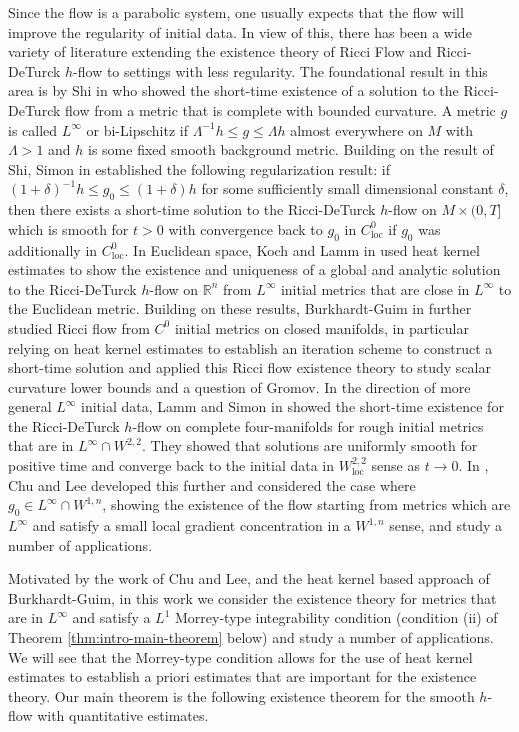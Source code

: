 \documentclass[12pt]{amsart}
\theoremstyle{plain}
\theoremstyle{plain}
\theoremstyle{definition}
\theoremstyle{remark}
\numberwithin{equation}{subsection}
\begin{document}
Since the flow is a parabolic system, one usually expects that the flow will improve the regularity of initial data. In view of this, there has been a wide variety of literature extending the existence theory of Ricci Flow and Ricci-DeTurck $h$-flow to settings with less regularity. The foundational result in this area is by Shi in \cite{shi_deforming_1989} who showed the short-time existence of a solution to the Ricci-DeTurck flow from a metric that is complete with bounded curvature. A metric $g$ is called $L^\infty$ or bi-Lipschitz if $\Lambda^{-1}h \leq g \leq \Lambda h$ almost everywhere on $M$ with $\Lambda >1$ and $h$ is some fixed smooth background metric. Building on the result of Shi, Simon in \cite{simon_deformation_2002} established the following regularization result: if $(1+\delta)^{-1}h \leq g_0 \leq (1+\delta)h$ for some sufficiently small dimensional constant $\delta$, then there exists a short-time solution to the Ricci-DeTurck $h$-flow on $M \times (0,T]$ which is smooth for $t > 0$ with convergence back to $g_0$ in $C^0_\text{loc}$ if $g_0$ was additionally in $C^0_\text{loc}$. In Euclidean space, Koch and Lamm in \cite{koch_geometric_2012} used heat kernel estimates to show the existence and uniqueness of a global and analytic solution to the Ricci-DeTurck $h$-flow on $\mathbb{R}^n$ from $L^\infty$ initial metrics that are close in $L^\infty$ to the Euclidean metric. Building on these results, Burkhardt-Guim in \cite{burkhardt-guim_pointwise_2019} further studied Ricci flow from $C^0$ initial metrics on closed manifolds, in particular relying on heat kernel estimates to establish an iteration scheme to construct a short-time solution and applied this Ricci flow existence theory to study scalar curvature lower bounds and a question of Gromov. In the direction of more general $L^\infty$ initial data, Lamm and Simon in \cite{lamm_ricci_2021} showed the short-time existence for the Ricci-DeTurck $h$-flow on complete four-manifolds for rough initial metrics that are in $L^\infty \cap W^{2,2}$. They showed that solutions are uniformly smooth for positive time and converge back to the initial data in $W^{2,2}_\text{loc}$ sense as $t\to0$. In \cite{chu_ricci-deturck_2022}, Chu and Lee developed this further and considered the case where $g_0 \in L^\infty \cap W^{1,n}$, showing the existence of the flow starting from metrics which are $L^\infty$ and satisfy a small local gradient concentration in a $W^{1,n}$ sense, and study a number of applications.

Motivated by the work of Chu and Lee, and the heat kernel based approach of Burkhardt-Guim, in this work we consider the existence theory for metrics that are in $L^\infty$ and satisfy a $L^1$ Morrey-type integrability condition (condition (ii) of Theorem \ref{thm:intro-main-theorem} below) and study a number of applications. We will see that the Morrey-type condition allows for the use of heat kernel estimates to establish a priori estimates that are important for the existence theory. Our main theorem is the following existence theorem for the smooth $h$-flow with quantitative estimates.
\end{document}
